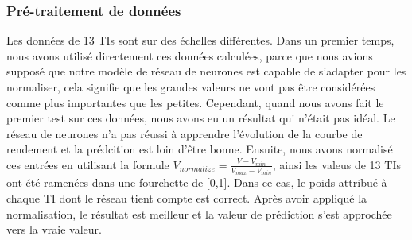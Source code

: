 \subsubsection{Pré-traitement de données}

Les données de 13 TIs sont sur des échelles différentes. Dans un premier temps, nous avons utilisé directement ces données calculées, parce que nous avions supposé que notre modèle de réseau de neurones est capable de s'adapter pour les normaliser, cela signifie que les grandes valeurs ne vont pas être considérées comme plus importantes que les petites. Cependant, quand nous avons fait le premier test sur ces données, nous avons eu un résultat qui n’était pas idéal. Le réseau de neurones n'a pas réussi à apprendre l'évolution de la courbe de rendement et la prédcition est loin d'être bonne. Ensuite, nous avons normalisé ces entrées en utilisant la formule $ V_{normalize} = \frac{V-V_{min}}{V_{max}-V_{min}}$, ainsi les valeus de 13 TIs ont été ramenées dans une fourchette de [0,1]. Dans ce cas, le poids attribué à chaque TI dont le réseau tient compte est correct. Après avoir appliqué la normalisation, le résultat est meilleur et la valeur de prédiction s'est approchée vers la vraie valeur.

